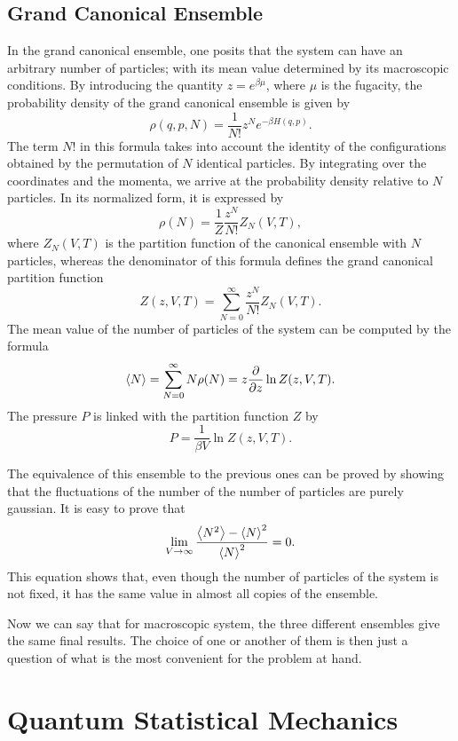 \documentclass[10pt]{article}
\begin{document}
	\subsection{Grand Canonical Ensemble}\label{Grand Canonical Ensemble}
	In the grand canonical ensemble, one posits that the system can have an arbitrary number of particles; with its mean value determined by its macroscopic conditions. By introducing the quantity $z=e^{\beta \mu}$, where $\mu$ is the fugacity, the probability density of the grand canonical ensemble is given by 
	$$\rho(q,p,N)=\dfrac{1}{N!}z^Ne^{-\beta H(q,p)}.$$
	The term $N!$ in this formula takes into account the identity of the configurations obtained by the permutation of $N$ identical particles. By integrating over the coordinates and the momenta, we arrive at the probability density relative to $N$ particles. In its normalized form, it is expressed by
	$$\rho(N)=\frac{1}{Z}\frac{z^N}{N!}Z_N(V,T),$$
	where $Z_N(V,T)$ is the partition function of the canonical ensemble with $N$ particles, whereas the denominator of this formula defines the grand canonical partition function 
	$$Z(z,V,T)=\sum_{N=0}^{\infty}\frac{z^N}{N!}Z_N(V,T).$$
	The mean value of the number of particles of the system can be computed by the formula 
	$$\expval{N}=\sum_{N=0}^{\infty}N\rho(N)=z\frac{\partial}{\partial z}\ln Z(z,V,T).$$
	The pressure $P$ is linked with the partition function $Z$ by
	$$P=\frac{1}{\beta V}\ln Z(z,V,T).$$
	
	The equivalence of this ensemble to the previous ones can be proved by showing that the fluctuations of the number of the number of particles are purely gaussian. It is easy to prove that 
	$$\lim_{V\rightarrow\infty}\frac{\expval{N^2}-\expval{N}^2}{\expval{N}^2}=0.$$
	This equation shows that, even though the number of particles of the system is not fixed, it has the same value in almost all copies of the ensemble. 
	
	Now we can say that for macroscopic system, the three different ensembles give the same final results. The choice of one or another of them is then just a question of what is the most convenient for the problem at hand.
	
	\section{Quantum Statistical Mechanics}
\end{document}
